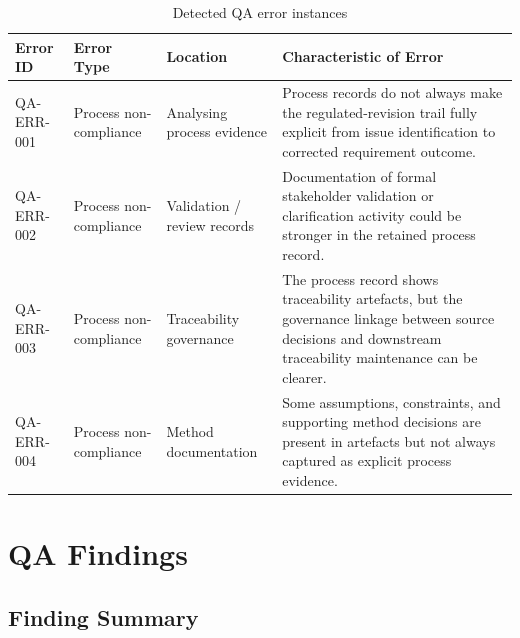 \documentclass[11pt,a4paper]{article}
\begin{document}
\begin{table}[H]
\centering
\small
\renewcommand{\arraystretch}{1.4}
\begin{tabularx}{\textwidth}{|p{}|p{}|p{}|X|}
\hline
\rowcolor{tableheader}
\textbf{Error ID} & \textbf{Error Type} & \textbf{Location} & \textbf{Characteristic of Error} \\
\hline
QA-ERR-001 & Process non-compliance & Analysing process evidence & Process records do not always make the regulated-revision trail fully explicit from issue identification to corrected requirement outcome. \\
\hline
QA-ERR-002 & Process non-compliance & Validation / review records & Documentation of formal stakeholder validation or clarification activity could be stronger in the retained process record. \\
\hline
QA-ERR-003 & Process non-compliance & Traceability governance & The process record shows traceability artefacts, but the governance linkage between source decisions and downstream traceability maintenance can be clearer. \\
\hline
QA-ERR-004 & Process non-compliance & Method documentation & Some assumptions, constraints, and supporting method decisions are present in artefacts but not always captured as explicit process evidence. \\
\hline
\end{tabularx}
\caption{Detected QA error instances}
\label{tab:qa-error-detection}
\end{table}


\section{QA Findings}

\subsection{Finding Summary}
\end{document}
